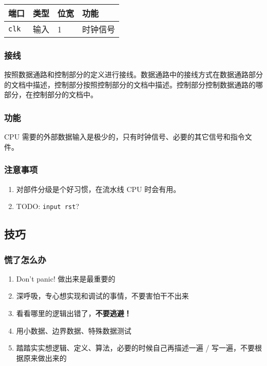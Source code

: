 \begin{longtable}[]{@{}llll@{}}
\toprule
端口 & 类型 & 位宽 & 功能\tabularnewline
\midrule
\endhead
\texttt{clk} & 输入 & 1 & 时钟信号\tabularnewline
\bottomrule
\end{longtable}

\hypertarget{ux63a5ux7ebf}{%
\subsubsection{接线}\label{ux63a5ux7ebf}}

按照数据通路和控制部分的定义进行接线。数据通路中的接线方式在数据通路部分的文档中描述，控制部分按照控制部分的文档中描述。控制部分控制数据通路的哪部分，在控制部分的文档中。

\hypertarget{ux529fux80fd-14}{%
\subsubsection{功能}\label{ux529fux80fd-14}}

CPU 需要的外部数据输入是极少的，只有时钟信号、必要的其它信号和指令文件。

\hypertarget{ux6ce8ux610fux4e8bux9879-8}{%
\subsubsection{注意事项}\label{ux6ce8ux610fux4e8bux9879-8}}

\begin{enumerate}
\def\labelenumi{\arabic{enumi}.}
\tightlist
\item
  对部件分级是个好习惯，在流水线 CPU 时会有用。
\item
  TODO: \texttt{input\ rst}?
\end{enumerate}

\hypertarget{ux6280ux5de7}{%
\subsection{技巧}\label{ux6280ux5de7}}

\hypertarget{ux614cux4e86ux600eux4e48ux529e}{%
\subsubsection{慌了怎么办}\label{ux614cux4e86ux600eux4e48ux529e}}

\begin{enumerate}
\def\labelenumi{\arabic{enumi}.}
\tightlist
\item
  Don't panic! 做出来是最重要的
\item
  深呼吸，专心想实现和调试的事情，不要害怕干不出来
\item
  看看哪里的逻辑出错了，\textbf{不要逃避！}
\item
  用小数据、边界数据、特殊数据测试
\item
  踏踏实实想逻辑、定义、算法，必要的时候自己再描述一遍 /
  写一遍，不要根据原来做出来的
\end{enumerate}


